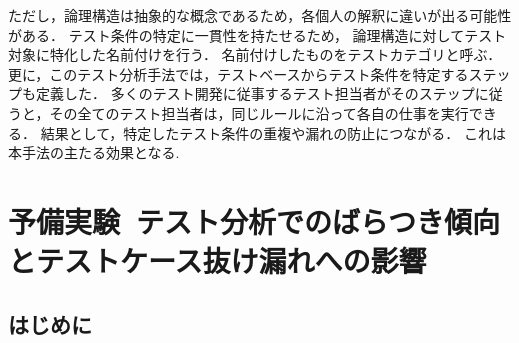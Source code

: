 \documentclass[a4paper,11pt]{jreport}
\begin{document}
ただし，論理構造は抽象的な概念であるため，各個人の解釈に違いが出る可能性がある．
テスト条件の特定に一貫性を持たせるため， 論理構造に対してテスト対象に特化した名前付けを行う．
名前付けしたものをテストカテゴリと呼ぶ．
更に，このテスト分析手法では，テストベースからテスト条件を特定するステップも定義した．
多くのテスト開発に従事するテスト担当者がそのステップに従うと，その全てのテスト担当者は，同じルールに沿って各自の仕事を実行できる．
結果として，特定したテスト条件の重複や漏れの防止につながる．
これは本手法の主たる効果となる.

\chapter{予備実験~テスト分析でのばらつき傾向とテストケース抜け漏れへの影響}\label{chap:3}
\section{はじめに}
\end{document}
